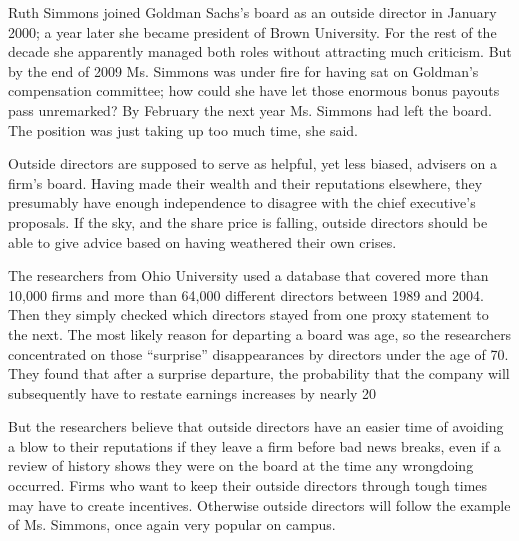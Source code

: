 Ruth Simmons joined Goldman Sachs's board as an outside director in January 2000; a year later she became president of Brown University. For the rest of the decade she apparently managed both roles without attracting much criticism. But by the end of 2009 Ms. Simmons was under fire for having sat on Goldman's compensation committee; how could she have let those enormous bonus payouts pass unremarked? By February the next year Ms. Simmons had left the board. The position was just taking up too much time, she said.


Outside directors are supposed to serve as helpful, yet less biased, advisers on a firm's board. Having made their wealth and their reputations elsewhere, they presumably have enough independence to disagree with the chief executive's proposals. If the sky, and the share price is falling, outside directors should be able to give advice based on having weathered their own crises.


The researchers from Ohio University used a database that covered more than 10,000 firms and more than 64,000 different directors between 1989 and 2004. Then they simply checked which directors stayed from one proxy statement to the next. The most likely reason for departing a board was age, so the researchers concentrated on those ``surprise'' disappearances by directors under the age of 70. They found that after a surprise departure, the probability that the company will subsequently have to restate earnings increases by nearly 20%


But the researchers believe that outside directors have an easier time of avoiding a blow to their reputations if they leave a firm before bad news breaks, even if a review of history shows they were on the board at the time any wrongdoing occurred. Firms who want to keep their outside directors through tough times may have to create incentives. Otherwise outside directors will follow the example of Ms. Simmons, once again very popular on campus.